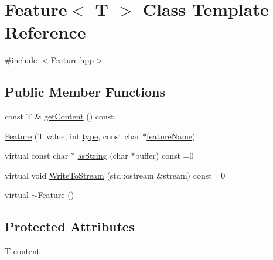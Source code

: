 \hypertarget{class_feature}{\section{Feature$<$ T $>$ Class Template Reference}
\label{class_feature}
}


{\ttfamily \#include $<$Feature.\+hpp$>$}

\subsection*{Public Member Functions}
\begin{DoxyCompactItemize}
\item 
const T \& \hyperlink{class_feature_a646c111235f484dd0ca89d122b2aac42}{get\+Content} () const 
\item 
\hyperlink{class_feature_a35e604731c88fd1aa8e8a36c87a1ce23}{Feature} (T value, int \hyperlink{class_feature_abstract_acab3574e41f892ae811b4adac8f5840a}{type}, const char $\ast$\hyperlink{class_feature_abstract_ae11ff57d87c0e49cf1cf95d71f407979}{feature\+Name})
\item 
virtual const char $\ast$ \hyperlink{class_feature_abdd71dfec0efebf4ff17aeb2bee257c3}{as\+String} (char $\ast$buffer) const =0
\item 
virtual void \hyperlink{class_feature_a459aef7873c75fb23ede86f71361239b}{Write\+To\+Stream} (std\+::ostream \&stream) const =0
\item 
virtual \hyperlink{class_feature_a93090fa295d12d22fff7c9de84d0ab20}{$\sim$\+Feature} ()
\end{DoxyCompactItemize}
\subsection*{Protected Attributes}
\begin{DoxyCompactItemize}
\item 
T \hyperlink{class_feature_a4379bdef5cd2e91346a780210c6984d9}{content}
\end{DoxyCompactItemize}


